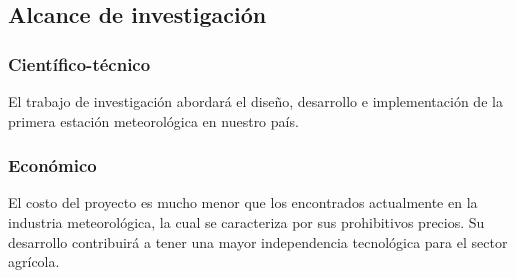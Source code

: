 \documentclass[conference, a4paper]{IEEEtran}
\begin{document}
\subsection{Alcance de investigación}\label{subsec:alcance-de-investigacion}

\subsubsection*{Científico-técnico} El trabajo de investigación abordará el diseño, desarrollo e implementación de la primera estación meteorológica en nuestro país.

\subsubsection*{Económico}
El costo del proyecto es mucho menor que los encontrados actualmente en la industria meteorológica, la cual se caracteriza por sus prohibitivos precios.
Su desarrollo contribuirá a tener una mayor independencia tecnológica para el sector agrícola.



\end{document}
